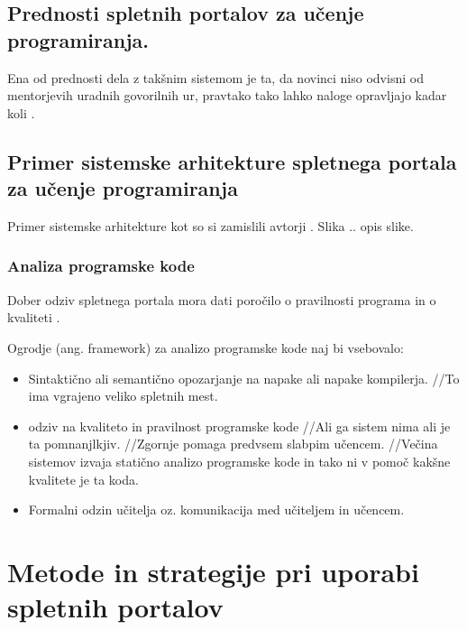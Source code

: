 \subsection{Prednosti spletnih portalov za učenje programiranja. }
\label{sec:prednosti_spzup}

Ena od prednosti dela z takšnim sistemom je ta, da novinci niso odvisni
od mentorjevih uradnih govorilnih ur, pravtako tako lahko naloge
opravljajo kadar koli \cite{thesisAWebP}.


\subsection{Primer sistemske arhitekture spletnega portala za učenje
  programiranja}
\label{sec:Primer_aritekture_spletnega_portala}

Primer sistemske arhitekture kot so si zamislili avtorji
\cite{ITaLCP_DistanceEdu}. Slika .. opis slike.


\subsubsection{Analiza programske kode}
\label{sec:analiza_programske_kode}


Dober odziv spletnega portala mora dati poročilo o pravilnosti programa in o
kvaliteti \cite{thesisAWebP}.

Ogrodje (ang. framework) za analizo programske kode naj bi vsebovalo:

\begin{itemize}
\item
  Sintaktično ali semantično opozarjanje na napake ali napake
  kompilerja. //To ima vgrajeno veliko spletnih mest.
\item
  odziv na kvaliteto in pravilnost programske kode //Ali ga sistem nima
  ali je ta pomnanjlkjiv. //Zgornje pomaga predvsem slabpim učencem.
  //Večina sistemov izvaja statično analizo programske kode in tako ni v
  pomoč kakšne kvalitete je ta koda.
\item
  Formalni odzin učitelja oz. komunikacija med učiteljem in učencem.
\end{itemize}


\section{Metode in strategije pri uporabi spletnih portalov}
\label{sec:Metode_in_strategije_pri_učenju_programiranja}

